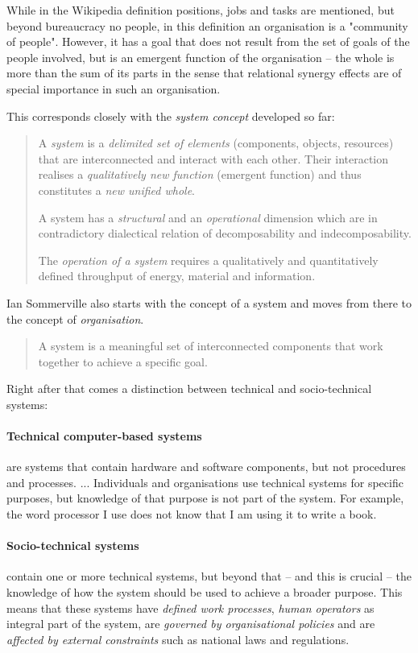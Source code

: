 \documentclass[11pt,a4paper]{article}
\begin{document}
While in the Wikipedia definition positions, jobs and tasks are mentioned, but
beyond bureaucracy no people, in this definition an organisation is a
"community of people". However, it has a goal that does not result from the
set of goals of the people involved, but is an emergent function of the
organisation -- the whole is more than the sum of its parts in the sense that
relational synergy effects are of special importance in such an organisation.

This corresponds closely with the \emph{system concept} developed so far:
\begin{quote}
  A \emph{system} is a \emph{delimited set of elements} (components, objects,
  resources) that are interconnected and interact with each other. Their
  interaction realises a \emph{qualitatively new function} (emergent function)
  and thus constitutes a \emph{new unified whole}.

  A system has a \emph{structural} and an \emph{operational} dimension which
  are in contradictory dialectical relation of decomposability and
  indecomposability.

  The \emph{operation of a system} requires a qualitatively and quantitatively
  defined throughput of energy, material and information.
\end{quote}

Ian Sommerville \cite{Sommerville2015} also starts with the concept of a
system and moves from there to the concept of \emph{organisation}.
\begin{quote}
  A system is a meaningful set of interconnected components that work together
  to achieve a specific goal.  \cite{Sommerville2015}
\end{quote}
Right after that comes a distinction between technical and socio-technical
systems:

\paragraph{Technical computer-based systems}
are systems that contain hardware and software components, but not procedures
and processes. ... Individuals and organisations use technical systems for
specific purposes, but knowledge of that purpose is not part of the system.
For example, the word processor I use does not know that I am using it to
write a book.

\paragraph{Socio-technical systems}
contain one or more technical systems, but beyond that -- and this is crucial
-- the knowledge of how the system should be used to achieve a broader
purpose.  This means that these systems have \emph{defined work processes},
\emph{human operators} as integral part of the system, are \emph{governed by
  organisational policies} and are \emph{affected by external constraints}
such as national laws and regulations.
\end{document}
